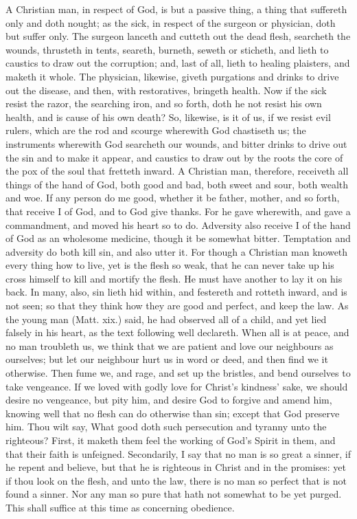 A Christian man, in respect of God, is but a passive thing,
a thing that suffereth only and doth nought; as the sick, 
in respect of the surgeon or physician, doth but suffer 
only. The surgeon lanceth and cutteth out the dead flesh, 
searcheth the wounds, thrusteth in tents, seareth, burneth, 
seweth or sticheth, and lieth to caustics to draw out the
corruption; and, last of all, lieth to healing plaisters, and 
maketh it whole. The physician, likewise, giveth purgations
and drinks to drive out the disease, and then, with 
restoratives, bringeth health. Now if the sick resist the 
razor, the searching iron, and so forth, doth he not resist 
his own health, and is cause of his own death? So, likewise,
is it of us, if we resist evil rulers, which are the rod
and scourge wherewith God chastiseth us; the instruments 
wherewith God searcheth our wounds, and bitter drinks 
to drive out the sin and to make it appear, and caustics to 
draw out by the roots the core of the pox of the soul that 
fretteth inward. A Christian man, therefore, receiveth all 
things of the hand of God, both good and bad, both sweet 
and sour, both wealth and woe. If any person do me good, 
whether it be father, mother, and so forth, that receive I of 
God, and to God give thanks. For he gave wherewith, and 
gave a commandment, and moved his heart so to do. Adversity
also receive I of the hand of God as an wholesome 
medicine, though it be somewhat bitter. Temptation and 
adversity do both kill sin, and also utter it. For though a 
Christian man knoweth every thing how to live, yet is the 
flesh so weak, that he can never take up his cross himself 
to kill and mortify the flesh. He must have another to 
lay it on his back. In many, also, sin lieth hid within, 
and festereth and rotteth inward, and is not seen; so that 
they think how they are good and perfect, and keep the 
law. As the young man (Matt. xix.) said, he had observed
all of a child, and yet lied falsely in his heart, as 
the text following well declareth. When all is at peace, 
and no man troubleth us, we think that we are patient and 
love our neighbours as ourselves; but let our neighbour 
hurt us in word or deed, and then find we it otherwise.
Then fume we, and rage, and set up the bristles, and bend 
ourselves to take vengeance. If we loved with godly love 
for Christ's kindness' sake, we should desire no vengeance, 
but pity him, and desire God to forgive and amend him, 
knowing well that no flesh can do otherwise than sin;
except that God preserve him. Thou wilt say, What 
good doth such persecution and tyranny unto the righteous?
First, it maketh them feel the working of God's 
Spirit in them, and that their faith is unfeigned. Secondarily,
I say that no man is so great a sinner, if he repent 
and believe, but that he is righteous in Christ and in the 
promises: yet if thou look on the flesh, and unto the law, 
there is no man so perfect that is not found a sinner. Nor 
any man so pure that hath not somewhat to be yet purged.
This shall suffice at this time as concerning obedience. 


